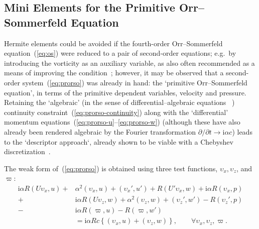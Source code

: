 \documentclass[twocolum]{afmc_art}
\begin{document}
\subsection{Mini Elements for the Primitive Orr--Sommerfeld Equation}
Hermite elements could be avoided if the fourth-order Orr--Sommerfeld equation~(\ref{eq:os}) were reduced to a pair of second-order equations; e.g.\ by introducing the vorticity as an auxiliary variable, as also often recommended as a means of improving the condition~\cite{dongarra1996chebyshev}; however, it may be observed that a second-order system~(\ref{eq:prorso}) was already in hand: the `primitive Orr--Sommerfeld equation', in terms of the primitive dependent variables, velocity and pressure.  Retaining the `algebraic' (in the sense of differential--algebraic equations~\cite{brenan1996numerical} \cite[\S 8.3]{azaez2011lments}) continuity constraint~(\ref{eq:prorso-continuity}) along with the `differential' momentum equations~(\ref{eq:prorso-u}--\ref{eq:prorso-w}) (although these have also already been rendered algebraic by the Fourier transformation $\partial/\partial t \rightarrow \mathrm i\alpha c$) leads to the `descriptor approach`, already shown to be viable with a Chebyshev discretization~\cite{manning2007descriptor}.

The weak form of~(\ref{eq:prorso}) is obtained using three test functions, $\upsilon_x, \upsilon_z$, and $\varpi$:
\begin{align} \label{eq:weak-prorso}
  \mathrm i\alpha R \left(U\upsilon_x, u\right)
  + & \alpha^2 \left(\upsilon_x, u\right)
  + \left(\upsilon_x', u'\right)
  + R\left(U'\upsilon_x, w\right) 
  + \mathrm i\alpha R\left(\upsilon_x, p\right)
  \nonumber \\
  + &   \mathrm i\alpha R \left(U\upsilon_z, w\right)
  + \alpha^2 \left(\upsilon_z, w\right)
  + \left(\upsilon_z', w'\right)
  - R\left(\upsilon_z', p\right) \nonumber \\ 
  - & \mathrm i\alpha R\left(\varpi, u\right)
  - R\left(\varpi, w'\right)
 \\  & = \mathrm i\alpha R c\left\{
  \left(\upsilon_x, u\right)
  + \left(\upsilon_z, w\right)
  \right\},
  \qquad\forall\upsilon_x, \upsilon_z,  \varpi.  \nonumber
\end{align}
\end{document}
